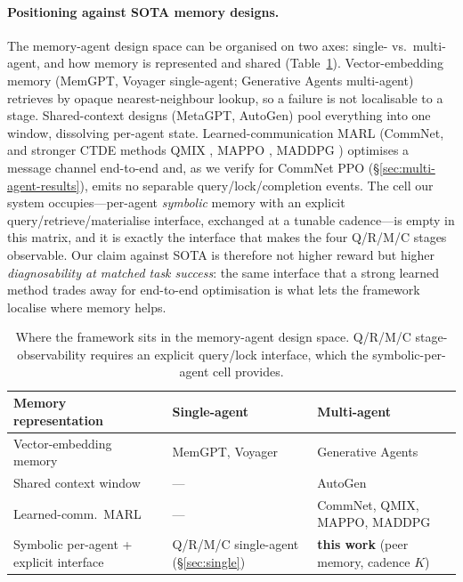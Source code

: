 \documentclass{article}
\begin{document}
\paragraph{Positioning against SOTA memory designs.}
The memory-agent design space can be organised on two axes: single- vs.\ multi-agent, and how memory is represented and shared (Table~\ref{tab:sota-quadrants}). Vector-embedding memory (MemGPT, Voyager single-agent; Generative Agents multi-agent) retrieves by opaque nearest-neighbour lookup, so a failure is not localisable to a stage. Shared-context designs (MetaGPT, AutoGen) pool everything into one window, dissolving per-agent state. Learned-communication MARL (CommNet, and stronger CTDE methods QMIX \citep{rashid2018qmix}, MAPPO \citep{yu2022mappo}, MADDPG \citep{lowe2017maddpg}) optimises a message channel end-to-end and, as we verify for CommNet PPO (\S\ref{sec:multi-agent-results}), emits no separable query/lock/completion events. The cell our system occupies---per-agent \emph{symbolic} memory with an explicit query/retrieve/materialise interface, exchanged at a tunable cadence---is empty in this matrix, and it is exactly the interface that makes the four Q/R/M/C stages observable. Our claim against SOTA is therefore not higher reward but higher \emph{diagnosability at matched task success}: the same interface that a strong learned method trades away for end-to-end optimisation is what lets the framework localise where memory helps.

\begin{table}[h]
\caption{Where the framework sits in the memory-agent design space. Q/R/M/C stage-observability requires an explicit query/lock interface, which the symbolic-per-agent cell provides.}
\label{tab:sota-quadrants}
\centering
\small
\begin{tabular}{p{3.1cm} p{4.3cm} p{4.3cm}}
\toprule
Memory representation & Single-agent & Multi-agent \\
\midrule
Vector-embedding memory & MemGPT, Voyager \citep{packer2023memgpt,wang2023voyager} & Generative Agents \citep{park2023generative} \\
Shared context window & --- & AutoGen \citep{wu2023autogen} \\
Learned-comm.\ MARL & --- & CommNet, QMIX, MAPPO, MADDPG \citep{sukhbaatar2016commnet,rashid2018qmix,yu2022mappo,lowe2017maddpg} \\
Symbolic per-agent + explicit interface & Q/R/M/C single-agent (\S\ref{sec:single}) & \textbf{this work} (peer memory, cadence $K$) \\
\bottomrule
\end{tabular}
\end{table}
\end{document}
